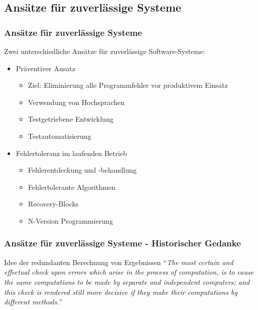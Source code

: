 \subsection{Ansätze für zuverlässige Systeme}
%
\begin{frame}
	\frametitle{Ansätze für zuverlässige Systeme}
	Zwei unterschiedliche Ansätze für zuverlässige Software-Systeme:
		
		\begin{itemize}
			\pause
			\item Präventiver Ansatz
			\begin{itemize}
				\item Ziel: Eliminierung alle Programmfehler vor produktivem Einsatz
				\item Verwendung von Hochsprachen
				\item Testgetriebene Entwicklung
				\item Testautomatisierung	
			\end{itemize}
			\pause	
			\item Fehlertoleranz im laufenden Betrieb	
			\begin{itemize}
				\item Fehlerentdeckung und -behandlung
				\item Fehlertolerante Algorithmen
				\item Recovery-Blocks
				\item N-Version Programmierung
			\end{itemize}
			
		\end{itemize}	
\end{frame}
%
%
\begin{frame}
	\frametitle{Ansätze für zuverlässige Systeme - Historischer Gedanke}
	\begin{block}{Idee der redundanten Berechnung von Ergebnissen \cite{lardner}}
		\enquote{\emph{The most certain and effectual check upon errors which arise in the process of computation,	is to cause the same computations to be made by separate and independent computers; and this	check is rendered still more decisive if they make their computations by different methods.}}
	\end{block}
\end{frame}
%
%
